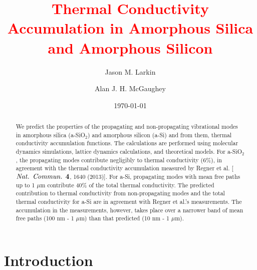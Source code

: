 \documentclass[aps,prb,twocolumn,superscriptaddress,footinbib,amsmath,amssymb,floatfix]{revtex4}
\begin{document}
\title{\textcolor{red}{Thermal Conductivity 
Accumulation in Amorphous Silica and Amorphous Silicon}}
\author{Jason M. Larkin}
\author{Alan J. H. McGaughey}

\date{\today}
\begin{abstract}
We predict the properties of the propagating and non-propagating 
vibrational modes in amorphous silica (a-SiO$_2$) and amorphous silicon 
(a-Si) and from them, thermal conductivity accumulation functions. 
The calculations are performed using molecular dynamics simulations, 
lattice dynamics calculations, and theoretical models. For a-SiO$_2$, 
the propagating modes contribute negligibly to thermal conductivity 
(6$\%$), in 
agreement with the thermal conductivity accumulation measured by 
Regner et al. [$\emph{Nat. Commun.}$ $\bf{4}$, 1640 (2013)]. 
For a-Si, propagating modes 
with mean free paths up to 1 $\mu$m contribute 40$\%$ of the total 
thermal 
conductivity. The predicted contribution to thermal conductivity from 
non-propagating modes and the total thermal conductivity for a-Si are in 
agreement with Regner et al.'s measurements. The accumulation in the 
measurements, however, takes place over a narrower band of 
mean free paths (100 nm - 1 $\mu$m) than that predicted 
(10 nm - 1 $\mu$m).
\end{abstract}
\maketitle
\section{\label{S:Introduction}Introduction}
\end{document}

